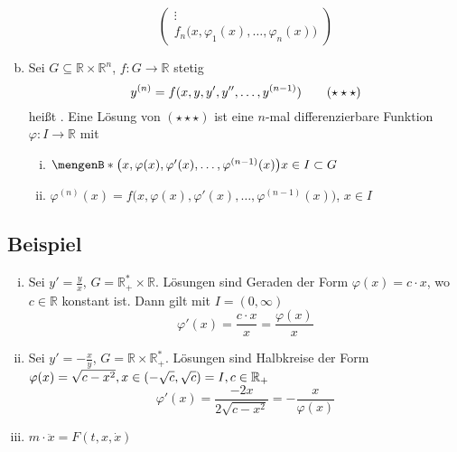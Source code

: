 \begin{enumerate}[a)]
\[\begin{pmatrix}
			\vdots \\
			f_n\big(x, \varphi_1(x), \ldots , \varphi_n(x)\big)
		\end{pmatrix}
	\]
	\item Sei $G \subseteq \mathds{R} \times \mathds{R}^n$, $f : G \to \mathds{R}$ stetig
	\[
		y^{(n)} = f (x,y,y',y'', \ldots , y^{(n-1)}) \tag{$\star\star\star$}
	\]
	heißt . Eine Lösung von $(\star \star \star)$ ist eine $n$-mal differenzierbare
	Funktion $\varphi : I \to \mathds{R}$ mit
	\begin{enumerate}[(i)]
		\item $\set[\big(x, \varphi(x), \varphi'(x), \ldots , \varphi^{(n-1)}(x)\big)]{x \in I} \subset G $
		\item $\varphi^{(n)}(x) = f\Big(x, \varphi(x), \varphi'(x), \ldots , \varphi^{(n-1)} (x)\Big)$, $x \in I$
	\end{enumerate}
\end{enumerate}

\subsection[Beispiel: Einfache Differentialgleichungen]{Beispiel} %
\label{sub:12}
\begin{enumerate}[(i)]
	\item \label{enum:12:1} Sei $y'= \frac{y}{x} $, $G= \mathds{R}_+^* \times \mathds{R}$. Lösungen sind Geraden der Form 
	$\varphi(x) = c \cdot x$, wo $c \in \mathds{R}$ konstant ist. Dann gilt mit $I = (0, \infty)$
	\[
		\varphi'(x) = \frac{c \cdot x}{x} = \frac{\varphi(x)}{x} 
	\]
	\item \label{enum:12:2} Sei $y'= - \frac{x}{y} $, $G = \mathds{R} \times \mathds{R}_+^*$. Lösungen sind Halbkreise der Form 
	$\varphi(x) = \sqrt{c-x^2} , x \in (- \sqrt{c}, \sqrt{c})=I , c \in \mathbb{R}_+ $
	\[
		\varphi'(x) = \frac{-2x}{2 \sqrt{c-x^2}  } = - \frac{x}{\varphi(x)}  
	\]
	\item $m \cdot \ddot x = F(t,x, \dot x)$ 
\end{enumerate}

